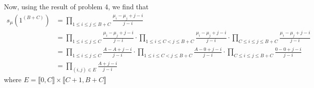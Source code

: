 \documentclass[12pt]{article}
\begin{document}
		Now, using the result of problem 4, we find that 
		\begin{align*}s_\mu(1^{(B+C)})&=\prod_{1\leq i\leq j\leq B+C}\frac{\mu_i-\mu_j+j-i}{j-i}\\
		&=\prod_{1\leq i\leq j \leq C}\frac{\mu_i-\mu_j+j-i}{j-i}\cdot\prod_{1\leq i \leq C<j\leq B+C} \frac{\mu_i-\mu_j+j-i}{j-i} \cdot \prod_{C\leq i\leq j \leq B+C}\frac{\mu_i-\mu_j+j-i}{j-i}\\
		&=\prod_{1\leq i\leq j \leq C}\frac{A-A+j-i}{j-i}\cdot\prod_{1\leq i \leq C<j\leq B+C} \frac{A-0+j-i}{j-i} \cdot \prod_{C\leq i\leq j \leq B+C}\frac{0-0+j-i}{j-i}\\
		&=\prod_{(i,j)\in E} \frac{A+j-i}{j-i}
		\end{align*} where $E=\llbracket{0,C}\rrbracket \times \llbracket C+1, B+C\rrbracket$
		
\end{document}
